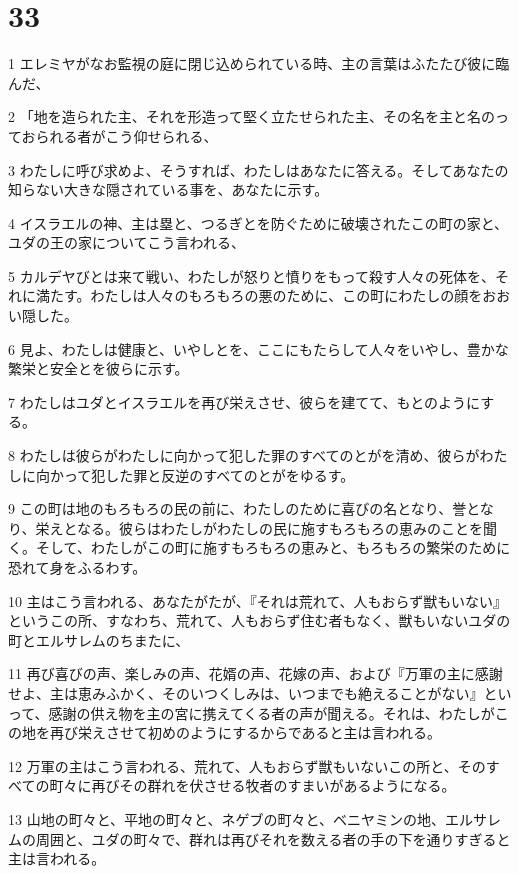 \chapter{33}

\par 1 エレミヤがなお監視の庭に閉じ込められている時、主の言葉はふたたび彼に臨んだ、
\par 2 「地を造られた主、それを形造って堅く立たせられた主、その名を主と名のっておられる者がこう仰せられる、
\par 3 わたしに呼び求めよ、そうすれば、わたしはあなたに答える。そしてあなたの知らない大きな隠されている事を、あなたに示す。
\par 4 イスラエルの神、主は塁と、つるぎとを防ぐために破壊されたこの町の家と、ユダの王の家についてこう言われる、
\par 5 カルデヤびとは来て戦い、わたしが怒りと憤りをもって殺す人々の死体を、それに満たす。わたしは人々のもろもろの悪のために、この町にわたしの顔をおおい隠した。
\par 6 見よ、わたしは健康と、いやしとを、ここにもたらして人々をいやし、豊かな繁栄と安全とを彼らに示す。
\par 7 わたしはユダとイスラエルを再び栄えさせ、彼らを建てて、もとのようにする。
\par 8 わたしは彼らがわたしに向かって犯した罪のすべてのとがを清め、彼らがわたしに向かって犯した罪と反逆のすべてのとがをゆるす。
\par 9 この町は地のもろもろの民の前に、わたしのために喜びの名となり、誉となり、栄えとなる。彼らはわたしがわたしの民に施すもろもろの恵みのことを聞く。そして、わたしがこの町に施すもろもろの恵みと、もろもろの繁栄のために恐れて身をふるわす。
\par 10 主はこう言われる、あなたがたが、『それは荒れて、人もおらず獣もいない』というこの所、すなわち、荒れて、人もおらず住む者もなく、獣もいないユダの町とエルサレムのちまたに、
\par 11 再び喜びの声、楽しみの声、花婿の声、花嫁の声、および『万軍の主に感謝せよ、主は恵みふかく、そのいつくしみは、いつまでも絶えることがない』といって、感謝の供え物を主の宮に携えてくる者の声が聞える。それは、わたしがこの地を再び栄えさせて初めのようにするからであると主は言われる。
\par 12 万軍の主はこう言われる、荒れて、人もおらず獣もいないこの所と、そのすべての町々に再びその群れを伏させる牧者のすまいがあるようになる。
\par 13 山地の町々と、平地の町々と、ネゲブの町々と、ベニヤミンの地、エルサレムの周囲と、ユダの町々で、群れは再びそれを数える者の手の下を通りすぎると主は言われる。
